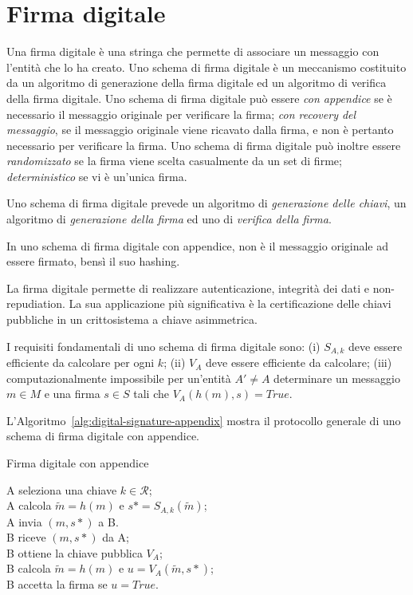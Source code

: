 \chapter{Firma digitale}
\label{chp:digital-signature}

Una firma digitale è una stringa che permette di associare un messaggio con l'entità che lo ha creato.
Uno schema di firma digitale è un meccanismo costituito da un algoritmo di generazione della firma digitale ed un algoritmo di verifica della firma digitale.
Uno schema di firma digitale può essere
\textit{con appendice} se è necessario il messaggio originale per verificare la firma;
\textit{con recovery del messaggio}, se il messaggio originale viene ricavato dalla firma, e non è pertanto necessario per verificare la firma.
Uno schema di firma digitale può inoltre essere
\textit{randomizzato} se la firma viene scelta casualmente da un set di firme;
\textit{deterministico} se vi è un'unica firma.

Uno schema di firma digitale prevede un algoritmo di \textit{generazione delle chiavi}, un algoritmo di \textit{generazione della firma} ed uno di \textit{verifica della firma}.

In uno schema di firma digitale con appendice, non è il messaggio originale ad essere firmato, bensì il suo hashing.

La firma digitale permette di realizzare autenticazione, integrità dei dati e non-repudiation. La sua applicazione più significativa è la certificazione delle chiavi pubbliche in un crittosistema a chiave asimmetrica.

I requisiti fondamentali di uno schema di firma digitale sono:
(i) $S_{A,k}$ deve essere efficiente da calcolare per ogni $k$;
(ii) $V_{A}$ deve essere efficiente da calcolare;
(iii) computazionalmente impossibile per un'entità $A'\neq A$ determinare un messaggio $m \in M$ e una firma $s \in S$ tali che $V_{A}(h(m),s)=True$.

L'Algoritmo~\ref{alg:digital-signature-appendix} mostra il protocollo generale di uno schema di firma digitale con appendice.

\bigskip
\begin{algorithm}[H]
  \caption{Firma digitale con appendice}
  \label{alg:digital-signature-appendix}
  \SetAlgoNoLine
  A seleziona una chiave $k \in \mathcal{R}$;\\
  A calcola $\tilde{m}=h(m)$ e $s*=S_{A,k}(\tilde{m})$;\\
  A invia $(m,s*)$ a B.\\

  B riceve $(m,s*)$ da A;\\
  B ottiene la chiave pubblica $V_{A}$;\\
  B calcola $\tilde{m}=h(m)$ e $u=V_{A}(\tilde{m},s*)$;\\
  B accetta la firma se $u=True$.
\end{algorithm}

